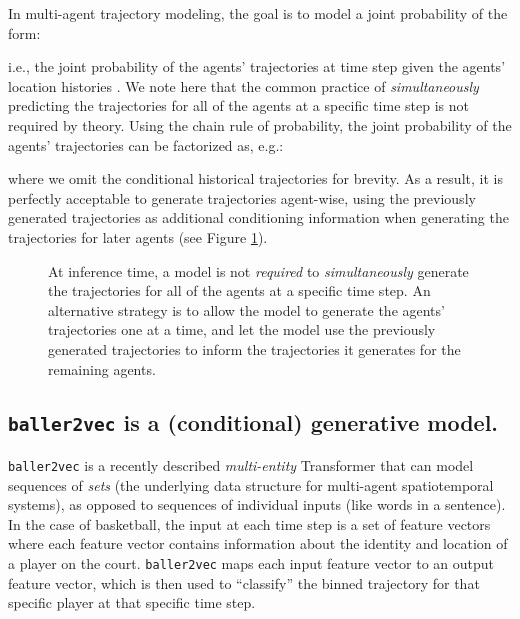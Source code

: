 \documentclass{article}
\newcommand{\btv}{\texttt{baller2vec}}
\begin{document}
In multi-agent trajectory modeling, the goal is to model a joint probability of the form:



\noindent
i.e., the joint probability of the  agents' trajectories  at time step  given the agents' location histories .
We note here that the common practice of \textit{simultaneously} predicting the trajectories for all of the agents at a specific time step is not required by theory.
Using the chain rule of probability, the joint probability of the agents' trajectories can be factorized as, e.g.:



where we omit the conditional historical trajectories for brevity.
As a result, it is perfectly acceptable to generate trajectories agent-wise, using the previously generated trajectories as additional conditioning information when generating the trajectories for later agents (see Figure \ref{fig:legal_dep}).

\begin{figure}[ht]
\centering
{}
\caption{
At inference time, a model is not \textit{required} to \textit{simultaneously} generate the trajectories for all of the agents at a specific time step.
An alternative strategy is to allow the model to generate the agents' trajectories one at a time, and let the model use the previously generated trajectories to inform the trajectories it generates for the remaining agents.
}
\label{fig:legal_dep}
\end{figure}

\subsection{\btv{} is a (conditional) generative model.}\label{sec:baller2vec_generative}

\btv{} is a recently described \textit{multi-entity} Transformer that can model sequences of \textit{sets} (the underlying data structure for multi-agent spatiotemporal systems), as opposed to sequences of individual inputs (like words in a sentence).
In the case of basketball, the input at each time step is a set of feature vectors where each feature vector contains information about the identity and location of a player on the court.
\btv{} maps each input feature vector to an output feature vector, which is then used to ``classify'' the binned trajectory for that specific player at that specific time step.
\end{document}
